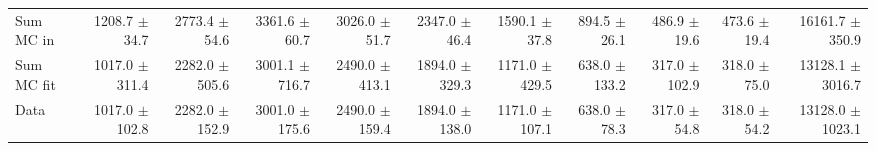 \begin{table}[htbp]
{\begin{tabular}{lrrrrrrrrrr}
\hline
Sum MC in & 1208.7 $\pm$ 34.7 & 2773.4 $\pm$ 54.6 & 3361.6 $\pm$ 60.7 & 3026.0 $\pm$ 51.7 & 2347.0 $\pm$ 46.4 & 1590.1 $\pm$ 37.8 & 894.5 $\pm$ 26.1 & 486.9 $\pm$ 19.6 & 473.6 $\pm$ 19.4& 16161.7 $\pm$ 350.9 \\
Sum MC fit & 1017.0 $\pm$ 311.4 & 2282.0 $\pm$ 505.6 & 3001.1 $\pm$ 716.7 & 2490.0 $\pm$ 413.1 & 1894.0 $\pm$ 329.3 & 1171.0 $\pm$ 429.5 & 638.0 $\pm$ 133.2 & 317.0 $\pm$ 102.9 & 318.0 $\pm$ 75.0 & 13128.1 $\pm$ 3016.7 \\
\hline
Data & 1017.0 $\pm$ 102.8 & 2282.0 $\pm$ 152.9 & 3001.0 $\pm$ 175.6 & 2490.0 $\pm$ 159.4 & 1894.0 $\pm$ 138.0 & 1171.0 $\pm$ 107.1 & 638.0 $\pm$ 78.3 & 317.0 $\pm$ 54.8 & 318.0 $\pm$ 54.2 & 13128.0 $\pm$ 1023.1 \\
\hline
\end{tabular}
}
\end{table}
